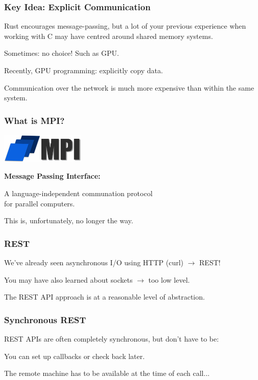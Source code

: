 \begin{frame}
  \frametitle{Key Idea: Explicit Communication}

  Rust encourages message-passing, but a lot of your previous experience when working with C may have centred around shared memory systems.
  
	Sometimes: no choice! Such as GPU.

  Recently, GPU programming: explicitly copy data.

Communication over the network is much more expensive than within the same system.

  
\end{frame}

\begin{frame}
  \frametitle{What is MPI?}

\begin{center}
	\includegraphics[width=0.3\textwidth]{images/mpi.png}
\end{center}
  {\bf Message Passing Interface:}

  A language-independent communation protocol\\ for parallel computers.

This is, unfortunately, no longer the way. 
  
\end{frame}




\begin{frame}
\frametitle{REST}

We've already seen asynchronous I/O using HTTP (curl) $\rightarrow$ REST!

You may have also learned about sockets $\rightarrow$ too low level.

The REST API approach is at a reasonable level of abstraction. 

\end{frame}


\begin{frame}
\frametitle{Synchronous REST}

REST APIs are often completely synchronous, but don't have to be:

You can set up  callbacks or check back later.

The remote machine has to be available at the time of each call...

\end{frame}


